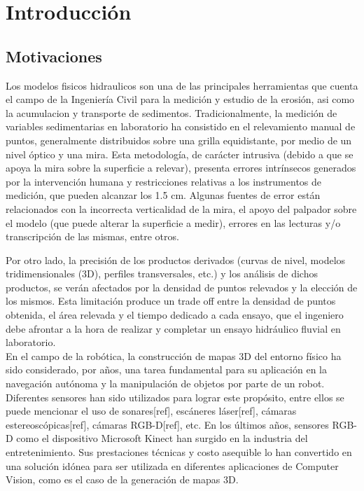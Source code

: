 \chapter{Introducción}

\section{Motivaciones}
\label{S:motivaciones}

Los modelos fisicos hidraulicos son una de las principales herramientas que cuenta el campo de la Ingeniería Civil para la medición y estudio de la erosión, asi como la acumulacion y transporte de sedimentos.
Tradicionalmente, la medición de variables sedimentarias en laboratorio ha consistido en el relevamiento manual de puntos, generalmente distribuidos sobre una grilla equidistante, por medio de un nivel óptico y una mira.
Esta metodología, de carácter intrusiva (debido a que se apoya la mira sobre la superficie a relevar), presenta errores intrínsecos generados por la intervención humana y restricciones relativas a los instrumentos de medición, que pueden alcanzar los 1.5 cm. Algunas fuentes de error están relacionados con la incorrecta verticalidad de la mira, el apoyo del palpador sobre el modelo (que puede alterar la superficie a medir), errores en las lecturas y/o transcripción de las mismas, entre otros.

Por otro lado, la precisión de los productos derivados (curvas de nivel, modelos tridimensionales (3D), perfiles transversales, etc.) y los análisis de dichos productos, se verán afectados por la densidad de puntos relevados y la elección de los mismos.
Esta limitación produce un trade off entre la densidad de puntos obtenida, el área relevada y el tiempo dedicado a cada ensayo, que el ingeniero debe afrontar a la hora de realizar y completar un ensayo hidráulico fluvial en laboratorio. \\


En el campo de la robótica, la construcción de mapas 3D del entorno físico ha sido considerado, por años, una tarea fundamental para su aplicación en la navegación autónoma y la manipulación de objetos por parte de un robot. Diferentes sensores han sido utilizados para lograr este propósito, entre ellos se puede mencionar el uso de sonares[ref], escáneres láser[ref], cámaras estereoscópicas[ref], cámaras RGB-D[ref], etc.
En los últimos años, sensores RGB-D como el dispositivo Microsoft Kinect han surgido en la industria del entretenimiento. Sus prestaciones técnicas y costo asequible lo han convertido en una solución idónea para ser utilizada en diferentes aplicaciones de Computer Vision, como es el caso de la generación de mapas 3D. \\

